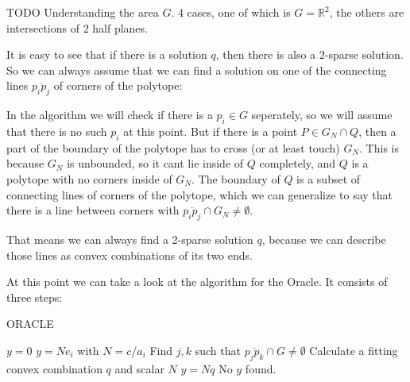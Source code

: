 \documentclass[11pt,a4paper]{scrartcl}
\newcommand{\R}{\mathbb{R}}
\begin{document}
\vspace{1cm}

TODO Understanding the area $G$. 4 cases, one of which is $G=\R^2$, the others are intersections of 2 half planes.

\vspace{1cm}

It is easy to see that if there is a solution $q$, then there is also a 2-sparse solution. So we can always assume that we can find a solution on one of the connecting lines $\overline{p_i p_j}$ of corners of the polytope:

{

\begin{wrapfigure}{r}{6cm}
\end{wrapfigure}

In the algorithm we will check if there is a $p_i\in G$ seperately, so we will assume that there is no such $p_i$ at this point. But if there is a point $P\in G_N\cap Q$,	then a part of the boundary of the polytope has to cross (or at least touch) $G_N$. This is because $G_N$ is unbounded, so it cant lie inside of $Q$ completely, and $Q$ is a polytope with no corners inside of $G_N$. The boundary of $Q$ is a subset of connecting lines of corners of the polytope, which we can generalize to say that there is a line between corners with $\overline{p_i p_j}\cap G_N\neq\emptyset$.

That means we can always find a 2-sparse solution $q$, because we can describe those lines as convex combinations of its two ends.

}

\vspace{1cm}

At this point we can take a look at the algorithm for the Oracle. It consists of three steps:

\begin{algorithm}
\caption{ORACLE}
\begin{algorithmic}
	\Comment{Step 1: Check if $G$ is all of $\R^2$}
    \State \Return $y=0$
    \State \Return $y=Ne_i$ with $N=c/a_i$
\Else
	\State Find $j,k$ such that $\overline{p_j p_k}\cap G\neq \emptyset$
		\State Calculate a fitting convex combination $q$ and scalar $N$
		\State \Return $y=Nq$
	\Else
		\State \Return	No $y$ found.
	\EndIf
\EndIf
\end{algorithmic}
\end{algorithm}
\end{document}
